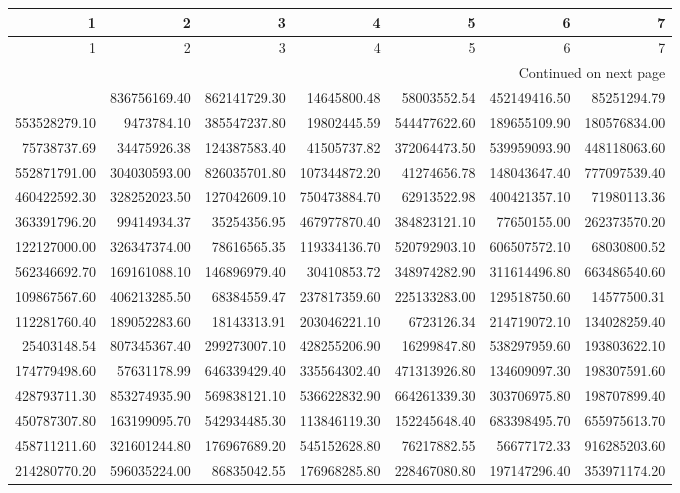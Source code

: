 \begin{longtable}{rrrrrrr}
\toprule
1 & 2 & 3 & 4 & 5 & 6 & 7 \\
\midrule
\endfirsthead
\toprule
1 & 2 & 3 & 4 & 5 & 6 & 7 \\
\midrule
\endhead
\midrule
\multicolumn{7}{r}{Continued on next page} \\
\midrule
\endfoot
\bottomrule
\endlastfoot
187875742.20 & 836756169.40 & 862141729.30 & 14645800.48 & 58003552.54 & 452149416.50 & 85251294.79 \\
553528279.10 & 9473784.10 & 385547237.80 & 19802445.59 & 544477622.60 & 189655109.90 & 180576834.00 \\
75738737.69 & 34475926.38 & 124387583.40 & 41505737.82 & 372064473.50 & 539959093.90 & 448118063.60 \\
552871791.00 & 304030593.00 & 826035701.80 & 107344872.20 & 41274656.78 & 148043647.40 & 777097539.40 \\
460422592.30 & 328252023.50 & 127042609.10 & 750473884.70 & 62913522.98 & 400421357.10 & 71980113.36 \\
363391796.20 & 99414934.37 & 35254356.95 & 467977870.40 & 384823121.10 & 77650155.00 & 262373570.20 \\
122127000.00 & 326347374.00 & 78616565.35 & 119334136.70 & 520792903.10 & 606507572.10 & 68030800.52 \\
562346692.70 & 169161088.10 & 146896979.40 & 30410853.72 & 348974282.90 & 311614496.80 & 663486540.60 \\
109867567.60 & 406213285.50 & 68384559.47 & 237817359.60 & 225133283.00 & 129518750.60 & 14577500.31 \\
112281760.40 & 189052283.60 & 18143313.91 & 203046221.10 & 6723126.34 & 214719072.10 & 134028259.40 \\
25403148.54 & 807345367.40 & 299273007.10 & 428255206.90 & 16299847.80 & 538297959.60 & 193803622.10 \\
174779498.60 & 57631178.99 & 646339429.40 & 335564302.40 & 471313926.80 & 134609097.30 & 198307591.60 \\
428793711.30 & 853274935.90 & 569838121.10 & 536622832.90 & 664261339.30 & 303706975.80 & 198707899.40 \\
450787307.80 & 163199095.70 & 542934485.30 & 113846119.30 & 152245648.40 & 683398495.70 & 655975613.70 \\
458711211.60 & 321601244.80 & 176967689.20 & 545152628.80 & 76217882.55 & 56677172.33 & 916285203.60 \\
214280770.20 & 596035224.00 & 86835042.55 & 176968285.80 & 228467080.80 & 197147296.40 & 353971174.20 \\
\end{longtable}
